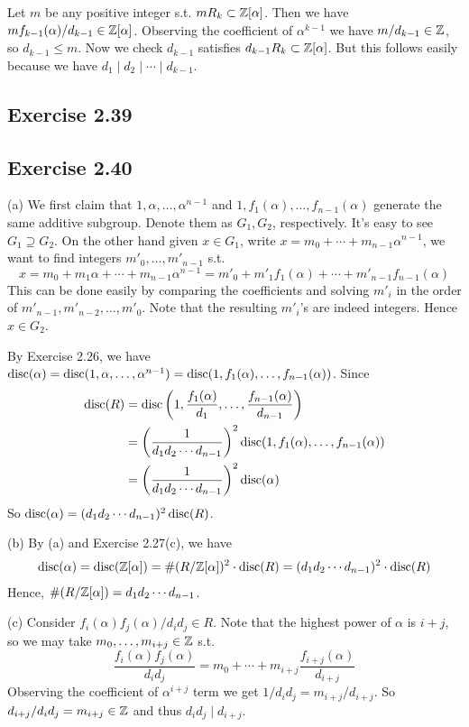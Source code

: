 \documentclass[../Marcus.tex]{subfiles}
\begin{document}
Let $m$ be any positive integer s.t. $mR_k\subset\mathbb{Z}[\alpha]$. Then we have $mf_{k-1}(\alpha)/d_{k-1}\in\mathbb{Z}[\alpha]$. Observing the coefficient of $\alpha^{k-1}$ we have $m/d_{k-1}\in\mathbb{Z}$, so $d_{k-1}\leq m$. Now we check $d_{k-1}$ satisfies $d_{k-1}R_k\subset \mathbb{Z}[\alpha]$. But this follows easily because we have $d_1\mid d_2\mid\cdots\mid d_{k-1}$.

\subsection*{Exercise 2.39}

\subsection*{Exercise 2.40}

(a) We first claim that $1,\alpha,\ldots,\alpha^{n-1}$ and $1,f_1(\alpha),\ldots,f_{n-1}(\alpha)$ generate the same additive subgroup. Denote them as $G_1,G_2$, respectively. It's easy to see $G_1\supseteq G_2$. On the other hand given $x\in G_1$, write $x=m_0+\cdots+m_{n-1}\alpha^{n-1}$, we want to find integers $m'_0,\ldots,m'_{n-1}$ s.t. $$x=m_0+m_1\alpha+\cdots+m_{n-1}\alpha^{n-1}=m'_0+m'_1f_1(\alpha)+\cdots+m'_{n-1}f_{n-1}(\alpha)$$ This can be done easily by comparing the coefficients and solving $m'_i$ in the order of $m'_{n-1},m'_{n-2},\ldots,m'_0$. Note that the resulting $m'_i$'s are indeed integers. Hence $x\in G_2$.

By Exercise 2.26, we have $\operatorname{disc}(\alpha)=\operatorname{disc}(1,\alpha,\ldots,\alpha^{n-1})=\operatorname{disc}(1,f_1(\alpha),\ldots,f_{n-1}(\alpha))$. Since 
\begin{align*}
    \operatorname{disc}(R) &= \operatorname{disc}\left(1,\frac{f_1(\alpha)}{d_1},\ldots,\frac{f_{n-1}(\alpha)}{d_{n-1}}\right) \\
    &= \left(\frac{1}{d_1d_2\cdots d_{n-1}}\right)^2\operatorname{disc}(1,f_1(\alpha),\ldots,f_{n-1}(\alpha)) \\ 
    &= \left(\frac{1}{d_1d_2\cdots d_{n-1}}\right)^2\operatorname{disc}(\alpha)
\end{align*}
So $\operatorname{disc}(\alpha)=(d_1d_2\cdots d_{n-1})^2\operatorname{disc}(R)$.

(b) By (a) and Exercise 2.27(c), we have
\begin{align*}
    \operatorname{disc}(\alpha)=\operatorname{disc}(\mathbb{Z}[\alpha])=\#(R/\mathbb{Z}[\alpha])^2\cdot\operatorname{disc}(R)=(d_1d_2\cdots d_{n-1})^2\cdot\operatorname{disc}(R)
\end{align*}
Hence, $\#(R/\mathbb{Z}[\alpha])=d_1d_2\cdots d_{n-1}$.

(c) Consider $f_i(\alpha)f_j(\alpha)/d_id_j\in R$. Note that the highest power of $\alpha$ is $i+j$, so we may take $m_0,\ldots,m_{i+j}\in\mathbb{Z}$ s.t. $$\frac{f_i(\alpha)f_j(\alpha)}{d_id_j}=m_0+\cdots+m_{i+j}\frac{f_{i+j}(\alpha)}{d_{i+j}}$$ Observing the coefficient of $\alpha^{i+j}$ term we get $1/d_id_j=m_{i+j}/d_{i+j}$. So $d_{i+j}/d_id_j=m_{i+j}\in\mathbb{Z}$ and thus $d_id_j\mid d_{i+j}$.
\end{document}
